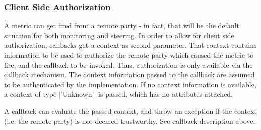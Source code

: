    \subsubsection*{Client Side Authorization}
 
    A metric can get fired from a remote party - in fact, that
    will be the default situation for both monitoring and
    steering.  In order to allow for client side authorization,
    callbacks get a context as second parameter.  That
    context contains information to be used to authorize the
    remote party which caused the metric to fire, and the
    callback to be invoked.  Thus, authorization is only
    available via the callback mechanism.  The context
    information passed to the callback are assumed to be
    authenticated by the implementation.  If no context
    information is available, a context of type
    |'Unknown'| is passed, which has no attributes attached.
 
    A callback can evaluate the passed context, and throw an
     exception if the context
    (i.e. the remote party) is not deemed trustworthy.  See
    callback description above.
 
